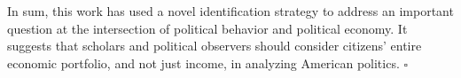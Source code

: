 In sum, this work has used a novel identification strategy to address an important question at the intersection of political behavior and political economy. It suggests that scholars and political observers should consider citizens' entire economic portfolio, and not just income, in analyzing American politics. \hfill $\square$ 